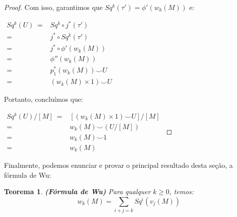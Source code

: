 \documentclass[12pt,oneside]{book} %
\newtheorem{teo}    {\hspace{0.5cm}Teorema}[chapter]
\newcommand{\ds}{\displaystyle}
\newcommand{\ccup}{\smile}
\begin{document}
\begin{proof}
	\par Com isso, garantimos que $Sq^{k}(\tau')=\phi'(w_{k}(M))$ e: \newline
	
	$ \begin{array}{rl}
		Sq^{k}(U) \ =	& Sq^{k}\circ j^{*}(\tau') \\
		=	& j^{*}\circ Sq^{k}(\tau') \\
		=	& j^{*}\circ\phi'(w_{k}(M)) \\
		=	& \phi''(w_{k}(M)) \\
		=	& p_{1}^{*}(w_{k}(M))\ccup U \\
		=	& (w_{k}(M)\times 1)\ccup U
	\end{array} $ \newline
	
	\par Portanto, concluímos que: \newline
	
	$ \begin{array}{rl}
		Sq^{k}(U)/[M] \ =	& \left[ (w_{k}(M)\times 1)\ccup U \right]/[M] \\
		=	& w_{k}(M)\ccup \left( U/[M] \right) \\
		=	& w_{k}(M)\ccup 1 \\
		=	& w_{k}(M)
	\end{array} $
	
\end{proof}

\par Finalmente, podemos enunciar e provar o principal resultado desta seção, a fórmula de Wu:

\begin{teo}{\bf (Fórmula de Wu)}
	Para qualquer $k\geq 0$, temos:
	$$ w_{k}(M)=\ds\sum_{i+j=k}Sq^{i}(v_{j}(M)) $$
\end{teo}
\end{document}
